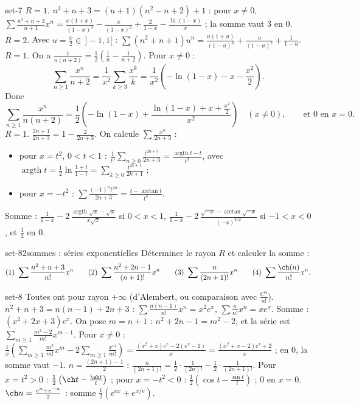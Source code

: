 \begin{corrige}{set-7}
 $R=1$. $n^3+n+3=(n+1)(n^2-n+2)+1$ : pour $x\neq0$,
$\displaystyle\sum\frac{n^3+n+3}{n+1}x^n=\frac{x(1+x)}{(1-x)^3}-\frac x{(1-x)^2}+\frac2{1-x}-\frac{\ln(1-x)}x$ ; la somme vaut $3$ en $0$.
 $R=2$. Avec $u=\frac x2\in\,]-1,1[$ : $\sum(n^2+n+1)u^n=\frac{u(1+u)}{(1-u)^3}+\frac u{(1-u)^2}+\frac1{1-u}$.
 $R=1$. On a $\frac1{n(n+2)}=\frac12\left(\frac1n-\frac1{n+2}\right)$. Pour $x\neq0$ :
\[\sum_{n\geq1}\frac{x^n}{n+2}=\frac1{x^2}\sum_{k\geq3}\frac{x^k}k=\frac1{x^2}\left(-\ln(1-x)-x-\frac{x^2}2\right).\]
Donc
\[\sum_{n\geq1}\frac{x^n}{n(n+2)}=\frac12\left(-\ln(1-x)+\frac{\ln(1-x)+x+\frac{x^2}2}{x^2}\right)\quad(x\neq0),\qquad\text{et }0\text{ en }x=0.\]
 $R=1$. $\frac{2n+1}{2n+3}=1-\frac2{2n+3}$. On calcule $\sum\frac{x^n}{2n+3}$ :
\begin{itemize}
\item pour $x=t^2$, $0<t<1$ : $\frac1{t^3}\sum_{n\geq0}\frac{t^{2n+3}}{2n+3}=\frac{\operatorname{argth}t-t}{t^3}$, avec $\operatorname{argth}t=\frac12\ln\frac{1+t}{1-t}=\sum_{k\geq0}\frac{t^{2k+1}}{2k+1}$ ;
\item pour $x=-t^2$ : $\sum\frac{(-1)^nt^{2n}}{2n+3}=\frac{t-\arctan t}{t^3}$.
\end{itemize}
Somme : $\frac1{1-x}-2\,\frac{\operatorname{argth}\sqrt x-\sqrt x}{x\sqrt x}$ si $0<x<1$, $\frac1{1-x}-2\,\frac{\sqrt{-x}-\arctan\sqrt{-x}}{(-x)^{3/2}}$ si $-1<x<0$,
et $\frac13$ en $0$.
\end{corrige}

\begin{exo}{set-8}{2}{sommes : séries exponentielles}
Déterminer le rayon $R$ et calculer la somme :
\[\text{(1)}\ \sum\frac{n^2+n+3}{n!}x^n\qquad\text{(2)}\ \sum\frac{n^2+2n-1}{(n+1)!}x^n\qquad\text{(3)}\ \sum\frac n{(2n+1)!}x^n\qquad\text{(4)}\ \sum\frac{\ch(n)}{n!}x^n.\]
\end{exo}

\begin{corrige}{set-8}
Toutes ont pour rayon $+\infty$ (d'Alembert, ou comparaison avec $\frac{C^n}{n!}$).
 $n^2+n+3=n(n-1)+2n+3$ : $\sum\frac{n(n-1)}{n!}x^n=x^2e^x$, $\sum\frac n{n!}x^n=xe^x$. Somme : $(x^2+2x+3)e^x$.
 On pose $m=n+1$ : $n^2+2n-1=m^2-2$, et la série est $\sum_{m\geq1}\frac{m^2-2}{m!}x^{m-1}$. Pour $x\neq0$ :
$\frac1x\left(\sum_{m\geq1}\frac{m^2}{m!}x^m-2\sum_{m\geq1}\frac{x^m}{m!}\right)=\frac{(x^2+x)e^x-2(e^x-1)}x=\frac{(x^2+x-2)e^x+2}x$ ; en $0$, la somme vaut $-1$.
 $n=\frac{(2n+1)-1}2$ : $\frac n{(2n+1)!}=\frac12\cdot\frac1{(2n)!}-\frac12\cdot\frac1{(2n+1)!}$. Pour $x=t^2>0$ : $\frac12\left(\ch t-\frac{\sh t}t\right)$ ; pour
$x=-t^2<0$ : $\frac12\left(\cos t-\frac{\sin t}t\right)$ ; $0$ en $x=0$.
 $\ch n=\frac{e^n+e^{-n}}2$ : somme $\frac12\left(e^{ex}+e^{x/e}\right)$.
\end{corrige}

